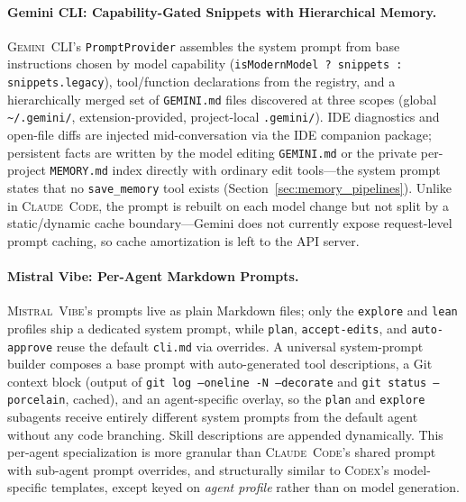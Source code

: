 \documentclass[11pt,a4paper]{article}
\newcommand{\clcode}{\textsc{Claude~Code}\xspace}
\newcommand{\cdx}{\textsc{Codex}\xspace}
\newcommand{\vibe}{\textsc{Mistral~Vibe}\xspace}
\newcommand{\gemini}{\textsc{Gemini~CLI}\xspace}
\begin{document}
\paragraph{Gemini CLI: Capability-Gated Snippets with Hierarchical Memory.}
\gemini{}'s \texttt{PromptProvider} assembles the system prompt from base instructions chosen by model capability (\texttt{isModernModel ? snippets : snippets.legacy}), tool/function declarations from the registry, and a hierarchically merged set of \texttt{GEMINI.md} files discovered at three scopes (global \texttt{\textasciitilde/.gemini/}, extension-provided, project-local \texttt{.gemini/}).
IDE diagnostics and open-file diffs are injected mid-conversation via the IDE companion package; persistent facts are written by the model editing \texttt{GEMINI.md} or the private per-project \texttt{MEMORY.md} index directly with ordinary edit tools---the system prompt states that no \texttt{save\_memory} tool exists (Section~\ref{sec:memory_pipelines}).
Unlike in \clcode{}, the prompt is rebuilt on each model change but not split by a static/dynamic cache boundary---Gemini does not currently expose request-level prompt caching, so cache amortization is left to the API server.

\paragraph{Mistral Vibe: Per-Agent Markdown Prompts.}
\vibe{}'s prompts live as plain Markdown files; only the \texttt{explore} and \texttt{lean} profiles ship a dedicated system prompt, while \texttt{plan}, \texttt{accept-edits}, and \texttt{auto-approve} reuse the default \texttt{cli.md} via overrides.
A universal system-prompt builder composes a base prompt with auto-generated tool descriptions, a Git context block (output of \texttt{git log --oneline -N --decorate} and \texttt{git status --porcelain}, cached), and an agent-specific overlay, so the \texttt{plan} and \texttt{explore} subagents receive entirely different system prompts from the default agent without any code branching.
Skill descriptions are appended dynamically.
This per-agent specialization is more granular than \clcode{}'s shared prompt with sub-agent prompt overrides, and structurally similar to \cdx{}'s model-specific templates, except keyed on \emph{agent profile} rather than on model generation.
\end{document}
